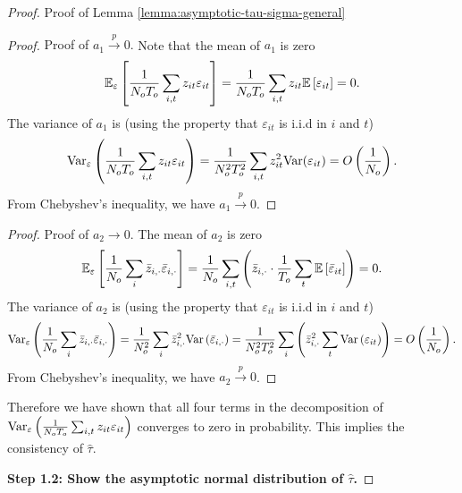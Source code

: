 \begin{proof}{Proof of Lemma \ref{lemma:asymptotic-tau-sigma-general}}
\begin{proof}{Proof of $a_1 \xrightarrow{p} 0$.}
Note that the mean of $a_1$ is zero 
\[\mathbb{E}_{\varepsilon}\left[\frac{1}{N_o T_o} \sum_{i,t} z_{it} \varepsilon_{it} \right] = \frac{1}{N_o T_o} \sum_{i,t} z_{it} \mathbb{E}\left[\varepsilon_{it} \right] = 0. \]
The variance of $a_1$ is (using the property that $\varepsilon_{it}$ is i.i.d in $i$ and $t$)
\begin{align*}
\mathrm{Var}_{\varepsilon}\left(\frac{1}{N_o T_o} \sum_{i,t} z_{it} \varepsilon_{it} \right) = \frac{1}{N^2_o T^2_o} \sum_{i,t} z^2_{it} \mathrm{Var}(\varepsilon_{it})  = O\left( \frac{1}{N_o}\right).
\end{align*}
From Chebyshev's inequality, we have $a_1 \xrightarrow{p} 0$.
   \halmos 
\end{proof}

\begin{proof}{Proof of $a_2 \rightarrow 0$.}
   The mean of  $a_2$ is zero
   \[\mathbb{E}_{\varepsilon}\left[\frac{1}{N_o } \sum_{i} \bar{z}_{i,\cdot} \bar{\varepsilon}_{i,\cdot} \right] = \frac{1}{N_o } \sum_{i,t} \left(\bar{z}_{i,\cdot} \cdot  \frac{1}{T_o} \sum_t \mathbb{E}\left[ \bar{\varepsilon}_{it}\right] \right)= 0. \]
   The variance of  $a_2$ is (using the property that $\varepsilon_{it}$ is i.i.d in $i$ and $t$)
   \begin{align*}
       \mathrm{Var}_{\varepsilon}\left(\frac{1}{N_o } \sum_{i} \bar{z}_{i,\cdot} \bar{\varepsilon}_{i,\cdot} \right) = \frac{1}{N_o^2} \sum_i \bar{z}_{i,\cdot}^2 \mathrm{Var}\left( \bar{\varepsilon}_{i,\cdot}\right) = \frac{1}{N_o^2 T_o^2} \sum_i \left(\bar{z}_{i,\cdot}^2 \sum_t \mathrm{Var}\left( \varepsilon_{it}\right)\right)= O\left( \frac{1}{N_o}\right).
   \end{align*}
   From Chebyshev's inequality, we have $a_2 \xrightarrow{p} 0$.
   \halmos
\end{proof}
Therefore we have shown that all four terms in the decomposition of $\mathrm{Var}_{\varepsilon}\left(\frac{1}{N_o T_o} \sum_{i,t} z_{it} \varepsilon_{it} \right)$ converges to zero in probability. This implies the consistency of $\hat{\tau}$.



\textbf{Step 1.2: Show the asymptotic normal distribution of $\hat{\tau}$.}


\end{proof}
